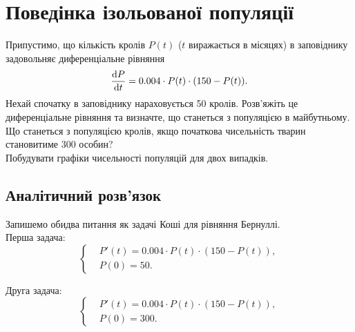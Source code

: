 




\tableofcontents

\section{Поведінка ізольованої популяції}

Припустимо, що кількість кролів $P(t)$ ($t$ виражається в місяцях) в заповіднику задовольняє диференціальне рівняння \[ \frac{\mathop{}\!\mathrm{d} P}{\mathop{}\!\mathrm{d} t} = 0.004 \cdot P(t) \cdot (150 - P(t)). \] Нехай спочатку в заповіднику нараховується 50 кролів. Розв'яжіть це диференціальне рівняння та визначте, що станеться з популяцією в майбутньому. \\

Що станеться з популяцією кролів, якщо початкова чисельність тварин становитиме 300 особин? \\

Побудувати графіки чисельності популяцій для двох випадків.

\subsection{Аналітичний розв'язок}

Запишемо обидва питання як задачі Коші для рівняння Бернуллі. \\

Перша задача:
\begin{equation*}
	\left\{
		\begin{aligned}
			& P'(t) = 0.004 \cdot P(t) \cdot (150 - P(t)), \\
			& P(0) = 50.
		\end{aligned}
	\right.
\end{equation*}

Друга задача:
\begin{equation*}
	\left\{
		\begin{aligned}
			& P'(t) = 0.004 \cdot P(t) \cdot (150 - P(t)), \\
			& P(0) = 300.
		\end{aligned}
	\right.
\end{equation*}

